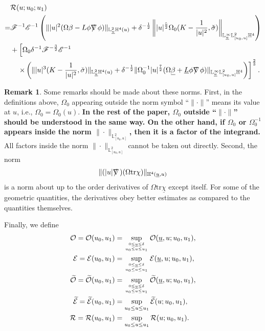 \documentclass[11pt,reqno]{amsart}
\theoremstyle{definition}
\newtheorem{remark}{Remark}[section]
\numberwithin{equation}{section}
\newcommand{\tr}{\mathrm{tr}}
\renewcommand{\L}{\mathbb{L}}
\renewcommand{\H}{\mathbb{H}}
\def\betab{\underline{\beta}}
\def\chib{\underline{\chi}}
\def\Lb{\underline{L}}
\def\tr{\mathrm{tr}}
\def\sigmac{\check{\sigma}}
\def\ub{\underline{u}}
\def\nablas{\mbox{$\nabla \mkern -13mu /$ }}
\def\ds{\mbox{$\nabla \mkern -13mu /$ }}
\begin{document}
\begin{align*}
    &\mathcal{R}(u;u_0;u_1)\\
    = &  \mathscr{F}^{-1}\mathscr{E}^{-1}\left(\||u|^2(\Omega\beta-L\phi\ds\phi)\|_{\L_{\ub}^2\H^4(u)} 
    +\delta^{-\frac{1}{2}}\left\||u|^{\frac{5}{2}}\Omega_0(K-\frac{1}{|u|^2},\sigmac)\right\|_{\L^\infty_{\ub}\L_{[u_0,u]}^2\H^4}\right)\\
    &+\left[\Omega_0\delta^{-1}\mathscr{F}^{-\frac{3}{2}}\mathscr{E}^{-1}\right.\\
    &\ \ \ \left.\times\left(\||u|^{3}(K-\frac{1}{|u|^2},\sigmac)\|_{\L_{\ub}^2\H^4(u)}    +\delta^{-\frac{1}{2}}\|\Omega_0^{-1}|u|^{\frac{7}{2}}(\Omega\betab+\Lb\phi\ds\phi)\|_{\L^\infty_{\ub}\L_{[u_0,u]}^2\H^4}\right)\right]^{\frac{2}{3}}.\\
 \end{align*}
 \begin{remark}
 Some remarks should be made about these norms. First, in the definitions above, $\Omega_0$ appearing outside the norm symbol ``$\|\cdot\|$'' means its value at $u$, i.e., $\Omega_0=\Omega_0(u)$. {\bf In the rest of the paper, $\Omega_0$ outside ``$\|\cdot\|$'' should be understood in the same way. On the other hand, if $\Omega_0$ or $\Omega_0^{-1}$ appears inside the norm $\|\cdot\|_{\L^2_{[u_0,u]}}$, then it is a factor of the integrand.} All factors inside the norm $\|\cdot\|_{\L^2_{[u_0,u]}}$ cannot be taken out directly. Second, the norm
 \begin{align*}
 \|(|u|\nablas)(\Omega\tr\chi)\|_{\H^4(\ub,u)}
 \end{align*}
 is a norm about up to the  order derivatives of $\Omega\tr\chib$ except itself. For some of the geometric quantities, the derivatives obey better estimates as compared to the quantities themselves.
 \end{remark}
 Finally, we define
\begin{align*}\mathcal{O}=\mathcal{O}(u_0,u_1)&=\sup_{0\le\ub\le\delta\atop u_0\le u\le u_1}\mathcal{O}(\ub,u;u_0,u_1),\\
\mathcal{E}=\mathcal{E}(u_0,u_1)&=\sup_{0\le\ub\le\delta\atop u_0\le u\le u_1}\mathcal{E}(\ub,u;u_0,u_1),\\
\widetilde{\mathcal{O}}=\widetilde{\mathcal{O}}(u_0,u_1)&=\sup_{0\le\ub\le\delta\atop u_0\le u\le u_1}\widetilde{\mathcal{O}}(\ub,u;u_0,u_1),\\
\widetilde{\mathcal{E}}=\widetilde{\mathcal{E}}(u_0,u_1)&=\sup_{u_0\le u\le u_1}\widetilde{\mathcal{E}}(u;u_0,u_1),\\
\mathcal{R}=\mathcal{R}(u_0,u_1)&=\sup_{u_0\le u\le u_1}\mathcal{R}(u;u_0,u_1).
\end{align*}
\end{document}
